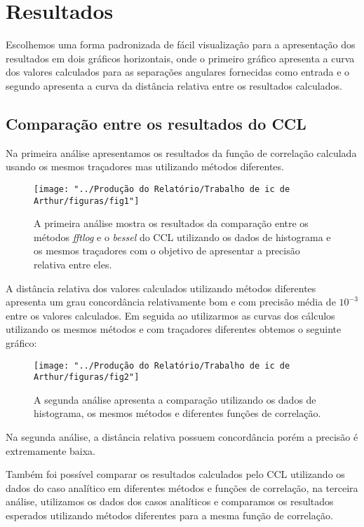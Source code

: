 	\chapter*{Resultados}

Escolhemos uma forma padronizada de fácil visualização para a apresentação dos resultados em dois gráficos horizontais, onde o primeiro gráfico apresenta a curva dos valores calculados para as separações angulares fornecidas como entrada e o segundo apresenta a curva da distância relativa entre os resultados calculados.  

\section*{Comparação entre os resultados do CCL}

 Na primeira análise apresentamos os resultados da função de correlação calculada usando os mesmos traçadores mas utilizando métodos diferentes.

\begin{figure}[h]
	\centering
	\texttt{[image: "../Produção do Relatório/Trabalho de ic de Arthur/figuras/fig1"]}
	\caption{A primeira análise mostra os resultados da comparação entre os métodos \textit{fftlog} e o \textit{bessel} do CCL utilizando os dados de histograma e os mesmos traçadores com o objetivo de apresentar a precisão relativa entre eles.}
	\label{fig:fig1}
\end{figure}

A distância relativa dos valores calculados utilizando métodos diferentes apresenta um grau concordância relativamente bom  e com precisão média de $ 10^{-3} $ entre os valores calculados. 
\newpage
Em seguida ao utilizarmos as curvas dos cálculos utilizando os mesmos métodos e com traçadores diferentes obtemos o seguinte gráfico:

\begin{figure}[h]
	\centering
	\texttt{[image: "../Produção do Relatório/Trabalho de ic de Arthur/figuras/fig2"]}
	\caption{A segunda análise apresenta a comparação utilizando os dados de histograma, os mesmos métodos e diferentes funções de correlação.}
	\label{fig:fig2}
\end{figure}

Na segunda análise, a distância relativa possuem concordância porém a precisão é extremamente baixa.

Também foi possível comparar os resultados calculados pelo CCL utilizando os dados do caso analítico em diferentes métodos e funções de correlação, na terceira análise, utilizamos os dados dos casos analíticos e comparamos os resultados esperados utilizando métodos diferentes para a mesma função de correlação.

